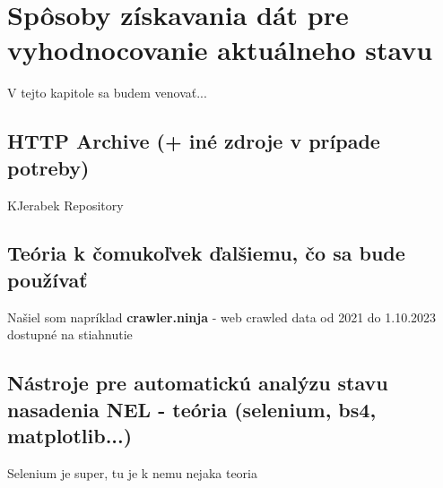 \chapter{Spôsoby získavania dát pre vyhodnocovanie aktuálneho stavu}
\label{data-sources-available-for-research}

V tejto kapitole sa budem venovať...


\section{HTTP Archive (+ iné zdroje v prípade potreby)}

KJerabek Repository

\section{Teória k čomukoľvek ďalšiemu, čo sa bude používať}

Našiel som napríklad \textbf{crawler.ninja} - web crawled data od 2021 do 1.10.2023 dostupné na stiahnutie

\section{Nástroje pre automatickú analýzu stavu nasadenia NEL - teória (selenium, bs4, matplotlib...)}

Selenium je super, tu je k nemu nejaka teoria
